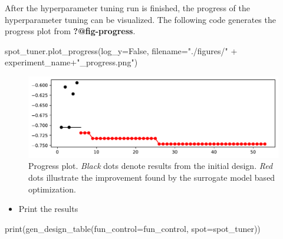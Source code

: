 \documentclass[
  letterpaper,
  DIV=11,
  numbers=noendperiod]{scrreprt}
\newenvironment{Shaded}{\begin{snugshade}}{\end{snugshade}}
\newcommand{\BuiltInTok}[1]{\textcolor[rgb]{0.00,0.23,0.31}{#1}}
\newcommand{\NormalTok}[1]{\textcolor[rgb]{0.00,0.23,0.31}{#1}}
\newcommand{\OperatorTok}[1]{\textcolor[rgb]{0.37,0.37,0.37}{#1}}
\newcommand{\StringTok}[1]{\textcolor[rgb]{0.13,0.47,0.30}{#1}}
\newcommand{\VariableTok}[1]{\textcolor[rgb]{0.07,0.07,0.07}{#1}}
\providecommand{\tightlist}{%
  \setlength{\itemsep}{0pt}\setlength{\parskip}{0pt}}\usepackage{longtable,booktabs,array}
\begin{document}
After the hyperparameter tuning run is finished, the progress of the
hyperparameter tuning can be visualized. The following code generates
the progress plot from \textbf{?@fig-progress}.

\begin{Shaded}
\begin{Highlighting}[]
\NormalTok{spot\_tuner.plot\_progress(log\_y}\OperatorTok{=}\VariableTok{False}\NormalTok{,}
\NormalTok{    filename}\OperatorTok{=}\StringTok{"./figures/"} \OperatorTok{+}\NormalTok{ experiment\_name}\OperatorTok{+}\StringTok{"\_progress.png"}\NormalTok{)}
\end{Highlighting}
\end{Shaded}

\begin{figure}[H]

{\centering \includegraphics{19_spot_hpt_sklearn_multiclass_classification_knn_files/figure-pdf/cell-25-output-1.pdf}

}

\caption{Progress plot. \emph{Black} dots denote results from the
initial design. \emph{Red} dots illustrate the improvement found by the
surrogate model based optimization.}

\end{figure}

\begin{itemize}
\tightlist
\item
  Print the results
\end{itemize}

\begin{Shaded}
\begin{Highlighting}[]
\BuiltInTok{print}\NormalTok{(gen\_design\_table(fun\_control}\OperatorTok{=}\NormalTok{fun\_control,}
\NormalTok{    spot}\OperatorTok{=}\NormalTok{spot\_tuner))}
\end{Highlighting}
\end{Shaded}
\end{document}
